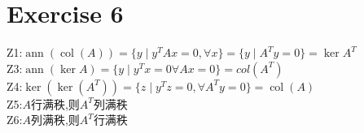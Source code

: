 \documentclass[11pt]{ctexart}
\theoremstyle{definition}
\numberwithin{equation}{section}
\newcommand{\op}[1]{\operatorname{#1}}%
\theoremstyle{definition}
\theoremstyle{remark}
\begin{document}
\section{Exercise 6}
\begin{aaa}
    Z1:$\op{ann}(\op{col}(A))=\{y\mid y^TAx=0,\forall x\}=\{y\mid A^Ty=0\}=\ker A^T$\\
    Z3:$\op{ann}(\ker A)=\{y\mid y^Tx=0 \forall Ax=0\}=col(A^T)$\\
    Z4:$\ker(\ker(A^T))=\{z\mid y^Tz=0,\forall A^Ty=0\}=\op{col}(A)$\\
    Z5:$A$行满秩,则$A^T$列满秩\\
    Z6:$A$列满秩,则$A^T$行满秩 
\end{aaa}
\end{document}
